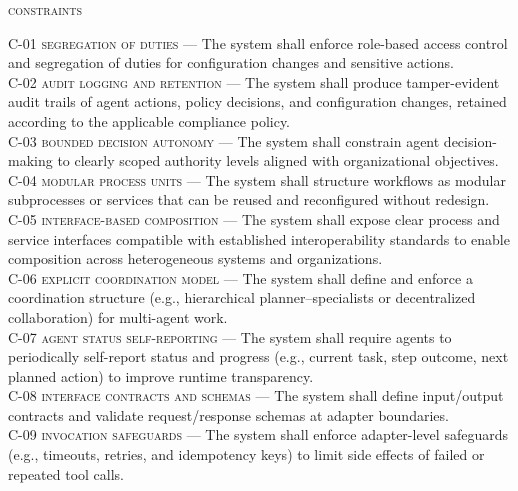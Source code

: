 \noindent \textsc{constraints} \\
\begin{footnotesize}
\noindent \textsc{C-01 segregation of duties} --- The system shall enforce role-based access control and segregation of duties for configuration changes and sensitive actions. \\
\noindent \textsc{C-02 audit logging and retention} --- The system shall produce tamper-evident audit trails of agent actions, policy decisions, and configuration changes, retained according to the applicable compliance policy. \\
\noindent \textsc{C-03 bounded decision autonomy} --- The system shall constrain agent decision-making to clearly scoped authority levels aligned with organizational objectives. \\
\noindent \textsc{C-04 modular process units} --- The system shall structure workflows as modular subprocesses or services that can be reused and reconfigured without redesign. \\
\noindent \textsc{C-05 interface-based composition} --- The system shall expose clear process and service interfaces compatible with established interoperability standards to enable composition across heterogeneous systems and organizations. \\
\noindent \textsc{C-06 explicit coordination model} --- The system shall define and enforce a coordination structure (e.g., hierarchical planner–specialists or decentralized collaboration) for multi-agent work. \\
\noindent \textsc{C-07 agent status self-reporting} --- The system shall require agents to periodically self-report status and progress (e.g., current task, step outcome, next planned action) to improve runtime transparency. \\
\noindent \textsc{C-08 interface contracts and schemas} --- The system shall define input/output contracts and validate request/response schemas at adapter boundaries. \\
\noindent \textsc{C-09 invocation safeguards} --- The system shall enforce adapter-level safeguards (e.g., timeouts, retries, and idempotency keys) to limit side effects of failed or repeated tool calls.
\end{footnotesize}

%   


